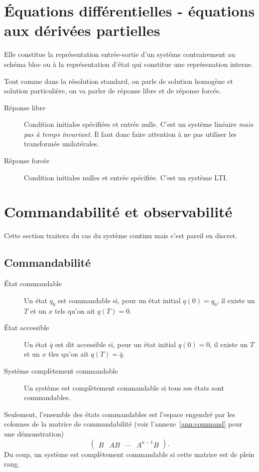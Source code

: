\section{Équations différentielles - équations aux dérivées partielles}
Elle constitue la représentation entrée-sortie d'un système contrairement
au schéma bloc ou à la représentation d'état qui constitue une représenation
interne.

Tout comme dans la résolution standard,
on parle de solution homogène et solution particulière,
on va parler de réponse libre et de réponse forcée.
\begin{description}
  \item[Réponse libre]
    Condition initiales spécifiées et entrée nulle.
    C'est un système linéaire \emph{mais pas à temps invariant}.
    Il faut donc faire attention à ne pas utiliser les transformée
    unilatérales.
  \item[Réponse forcée]
    Condition initiales nulles et entrée spécifiée.
    C'est un système LTI.
\end{description}

\section{Commandabilité et observabilité}
Cette section traitera du cas du système continu mais c'est pareil en discret.
\subsection{Commandabilité}
\begin{description}
  \item[État commandable]
    Un état $q_0$ est commandable si,
    pour un état initial $q(0) = q_0$,
    il existe un $T$ et un $x$ tels qu'on ait $q(T) = 0$.
  \item[État accessible]
    Un état $\bar{q}$ est dit accessible si,
    pour un état initial $q(0) = 0$,
    il existe un $T$ et un $x$ tles qu'on ait $q(T) = \bar{q}$.
  \item[Système complètement commandable]
    Un système est complètement commandable si tous ses états sont
    commandables.
\end{description}

Seulement, l'ensemble des états commandables est l'espace engendré
par les colonnes de la matrice de commandabilité
(voir l'annexe~\ref{ann:command} pour une démonstration)
\[ \begin{pmatrix}B & AB & \cdots & A^{n-1}B\end{pmatrix}. \]
Du coup, un système est complètement commandable si cette matrice est de
plein rang.


